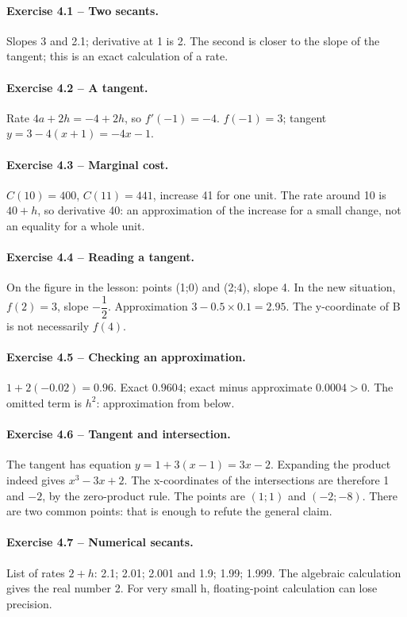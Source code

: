 \paragraph{Exercise 4.1 -- Two secants.} Slopes 3 and 2.1; derivative at 1 is 2. The second is closer to the slope of the tangent; this is an exact calculation of a rate.
\paragraph{Exercise 4.2 -- A tangent.} Rate $4a+2h=-4+2h$, so $f\prime(-1)=-4$. $f(-1)=3$; tangent $y=3-4(x+1)=-4x-1$.
\paragraph{Exercise 4.3 -- Marginal cost.} $C(10)=400$, $C(11)=441$, increase 41 for one unit. The rate around 10 is $40+h$, so derivative 40: an approximation of the increase for a small change, not an equality for a whole unit.
\paragraph{Exercise 4.4 -- Reading a tangent.} On the figure in the lesson: points (1;0) and (2;4), slope 4. In the new situation, $f(2)=3$, slope $-\dfrac{1}{2}$. Approximation $3-0.5\times0.1=2.95$. The y-coordinate of B is not necessarily $f(4)$.
\paragraph{Exercise 4.5 -- Checking an approximation.} $1+2(-0.02)=0.96$. Exact $0.9604$; exact minus approximate $0.0004>0$. The omitted term is $h^2$: approximation from below.
\paragraph{Exercise 4.6 -- Tangent and intersection.} The tangent has equation $y=1+3(x-1)=3x-2$. Expanding the product indeed gives $x^3-3x+2$. The x-coordinates of the intersections are therefore 1 and $-2$, by the zero-product rule. The points are $(1;1)$ and $(-2;-8)$. There are two common points: that is enough to refute the general claim.
\paragraph{Exercise 4.7 -- Numerical secants.} List of rates $2+h$: 2.1; 2.01; 2.001 and 1.9; 1.99; 1.999. The algebraic calculation gives the real number 2. For very small h, floating-point calculation can lose precision.
